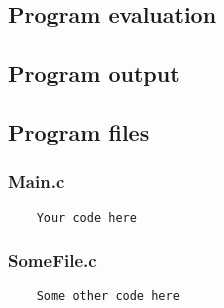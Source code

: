 \documentclass{article}
\begin{document}
	
	\subsection*{Program evaluation}
	
	
	\subsection*{Program output}
	
	
	\subsection*{Program files}
	\subsubsection*{Main.c}
	\begin{lstlisting}
	Your code here
	\end{lstlisting}
	
	\subsubsection*{SomeFile.c}
	\begin{lstlisting}
	Some other code here
	\end{lstlisting}
	
\end{document}
